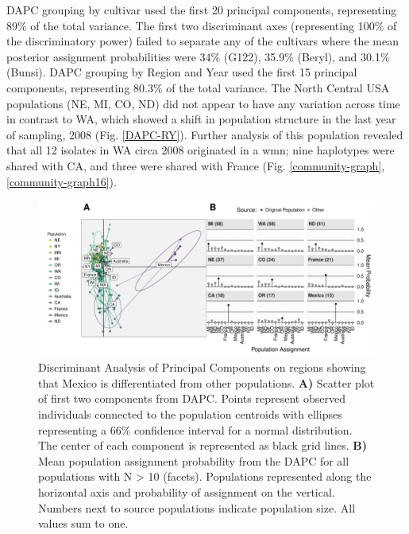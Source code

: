 \documentclass[fleqn,10pt,lineno]{wlpeerj} %
\theoremstyle{definition}
\theoremstyle{definition}
\theoremstyle{definition}
\theoremstyle{remark}
\begin{document}
DAPC grouping by cultivar used the first 20 principal components,
representing 89\% of the total variance. The first two discriminant axes
(representing 100\% of the discriminatory power) failed to separate any
of the cultivars where the mean posterior assignment probabilities were
34\% (G122), 35.9\% (Beryl), and 30.1\% (Bunsi). DAPC grouping by Region
and Year used the first 15 principal components, representing 80.3\% of
the total variance. The North Central USA populations (NE, MI, CO, ND)
did not appear to have any variation across time in contrast to WA,
which showed a shift in population structure in the last year of
sampling, 2008 (Fig. \ref{DAPC-RY}). Further analysis of this population
revealed that all 12 isolates in WA circa 2008 originated in a wmn; nine
haplotypes were shared with CA, and three were shared with France (Fig.
\ref{community-graph}, \ref{community-graph16}).

\begin{figure}
\centering
\includegraphics[width=1.00000\textwidth]{../../results/figures/publication/DAPC.pdf}
\caption{Discriminant Analysis of Principal Components on regions
showing that Mexico is differentiated from other populations.
\textbf{A)} Scatter plot of first two components from DAPC. Points
represent observed individuals connected to the population centroids
with ellipses representing a 66\% confidence interval for a normal
distribution. The center of each component is represented as black grid
lines. \textbf{B)} Mean population assignment probability from the DAPC
for all populations with N \textgreater{} 10 (facets). Populations
represented along the horizontal axis and probability of assignment on
the vertical. Numbers next to source populations indicate population
size. All values sum to one.}\label{DAPC}
\end{figure}
\end{document}
